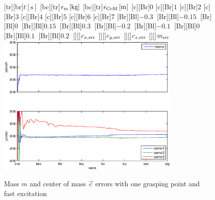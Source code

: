 \begin{figure}
	\centering	
	[tr][br]{$t\left[\mathrm{s}\right]$}
	[bc][tr]{$\epsilon_{\mathrm{m}}\left[\mathrm{kg}\right]$}
	[bc][tr]{$\epsilon_{\mathrm{CoM}}\left[\mathrm{m}\right]$}
	[Br]{$0$}
	[Br]{$1$}
	[Br]{$2$}
	[Br]{$3$}
	[Br]{$4$}
	[Br]{$5$}
	[Br]{$6$}
	[Br]{$7$}
	[Br][Bl]{$-0.3\  $}
	[Br][Bl]{$-0.15\ $}
	[Br][Bl]{$0\  $}
	[Br][Bl]{$0.15\  $}
	[Br][Bl]{$0.3\  $}
	[Br][Bl]{$-0.2\  $}
	[Br][Bl]{$-0.1\ $}
	[Br][Bl]{$0\  $}
	[Br][Bl]{$0.1\  $}
	[Br][Bl]{$0.2\  $}
	[][]{\tiny $c_{x,\mathrm{err}}$}
	[][]{\tiny $c_{y,\mathrm{err}}$}
	[][]{\tiny $c_{z,\mathrm{err}}$}
	[][]{\tiny $m_{\mathrm{err}}$}
	\includegraphics[width=0.8\textwidth]{figures/one_grasping_point_fast_mass_and_cog.eps}
	\vspace{0.2cm}
	\caption[Mass error, one grasping point, fast excitation]{Mass $m$ and center of mass $\vec{c}$ errors with one grasping point and fast excitation}
	\label{fig:estim_mass_one_fast}
\end{figure}

